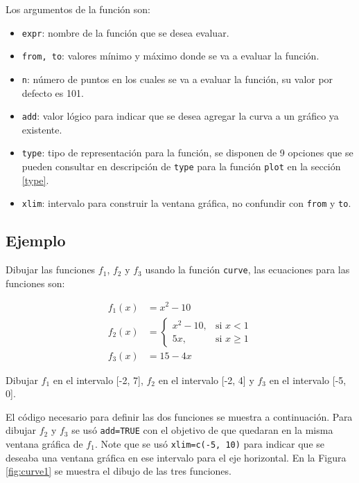 \documentclass[10pt,]{krantz}
\providecommand{\tightlist}{%
  \setlength{\itemsep}{0pt}\setlength{\parskip}{0pt}}
\begin{document}
Los argumentos de la función son:

\begin{itemize}
\tightlist
\item
  \texttt{expr}: nombre de la función que se desea evaluar.
\item
  \texttt{from,\ to}: valores mínimo y máximo donde se va a evaluar la
  función.
\item
  \texttt{n}: número de puntos en los cuales se va a evaluar la función,
  su valor por defecto es 101.
\item
  \texttt{add}: valor lógico para indicar que se desea agregar la curva
  a un gráfico ya existente.
\item
  \texttt{type}: tipo de representación para la función, se disponen de
  9 opciones que se pueden consultar en descripción de \texttt{type}
  para la función \texttt{plot} en la sección \ref{type}.
\item
  \texttt{xlim}: intervalo para construir la ventana gráfica, no
  confundir con \texttt{from} y \texttt{to}.
\end{itemize}

\subsection*{Ejemplo}\label{ejemplo-41}


Dibujar las funciones \(f_1\), \(f_2\) y \(f_3\) usando la función
\texttt{curve}, las ecuaciones para las funciones son:

\begin{align}
f_1(x) &= x^2-10 \\
f_2(x) &= \begin{cases} x^2-10, & \mbox{si } x < 1 \\ 5 x, & \mbox{si } x \geq 1 \end{cases} \\
f_3(x) &=15-4x
\end{align}

Dibujar \(f_1\) en el intervalo {[}-2, 7{]}, \(f_2\) en el intervalo
{[}-2, 4{]} y \(f_3\) en el intervalo {[}-5, 0{]}.

El código necesario para definir las dos funciones se muestra a
continuación. Para dibujar \(f_2\) y \(f_3\) se usó \texttt{add=TRUE}
con el objetivo de que quedaran en la misma ventana gráfica de \(f_1\).
Note que se usó \texttt{xlim=c(-5,\ 10)} para indicar que se deseaba una
ventana gráfica en ese intervalo para el eje horizontal. En la Figura
\ref{fig:curve1} se muestra el dibujo de las tres funciones.
\end{document}
